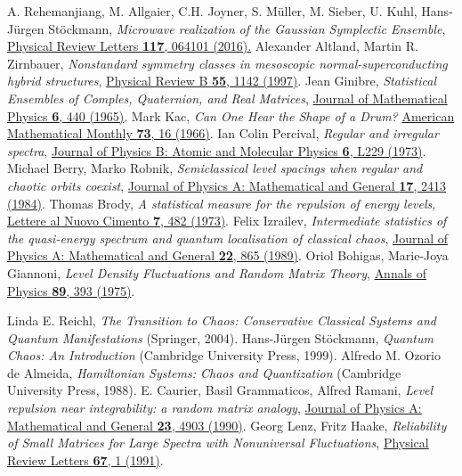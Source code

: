 \documentclass[a4paper,11pt,twoside]{article}
\begin{document}
\begin{thebibliography}{99}
     A. Rehemanjiang, M. Allgaier, C.H. Joyner, S. Müller, M. Sieber, U. Kuhl, Hans-Jürgen Stöckmann, {\it Microwave realization of the Gaussian Symplectic Ensemble}, \href{https://link.aps.org/doi/10.1103/PhysRevLett.117.064101}{Physical Review Letters {\bf 117}, 064101 (2016).}
     Alexander Altland, Martin R. Zirnbauer, {\it Nonstandard symmetry classes in mesoscopic normal-superconducting hybrid structures}, \href{https://journals.aps.org/prb/abstract/10.1103/PhysRevB.55.1142}{Physical Review B {\bf 55}, 1142 (1997)}.
     Jean Ginibre, {\it Statistical Ensembles of Comples, Quaternion, and Real Matrices}, \href{https://aip.scitation.org/doi/10.1063/1.1704292}{Journal of Mathematical Physics {\bf 6}, 440 (1965)}.
     Mark Kac, {\it Can One Hear the Shape of a Drum?} \href{https://www.maa.org/sites/default/files/pdf/upload_library/22/Ford/MarkKac.pdf}{American Mathematical Monthly {\bf 73}, 16 (1966)}.
     Ian Colin Percival, {\it Regular and irregular spectra}, \href{https://iopscience.iop.org/article/10.1088/0022-3700/6/9/002/pdf}{Journal of Physics B: Atomic and Molecular Physics {\bf 6}, L229 (1973)}.
     Michael Berry, Marko Robnik, {\it Semiclassical level spacings when regular and chaotic orbits coexist}, \href{https://iopscience.iop.org/article/10.1088/0305-4470/17/12/013}{Journal of Physics A: Mathematical and General {\bf 17}, 2413 (1984)}.
     Thomas Brody, {\it A statistical measure for the repulsion of energy levels}, \href{https://link.springer.com/article/10.1007/BF02727859}{Lettere al Nuovo Cimento {\bf 7}, 482 (1973)}.
     Felix Izrailev, {\it Intermediate statistics of the quasi-energy spectrum and quantum localisation of classical chaos}, \href{https://iopscience.iop.org/article/10.1088/0305-4470/22/7/017/meta}{Journal of Physics A: Mathematical and General {\bf 22}, 865 (1989)}.
     Oriol Bohigas, Marie-Joya Giannoni, {\it Level Density Fluctuations and Random Matrix Theory}, \href{https://www.sciencedirect.com/science/article/abs/pii/0003491675901876}{Annals of Physics {\bf 89}, 393 (1975)}.

     Linda E. Reichl, {\it The Transition to Chaos: Conservative Classical Systems and Quantum Manifestations} (Springer, 2004).
     Hans-Jürgen Stöckmann, {\it Quantum Chaos: An Introduction} (Cambridge University Press, 1999).
     Alfredo M. Ozorio de Almeida, {\it Hamiltonian Systems: Chaos and Quantization} (Cambridge University Press, 1988).
     E. Caurier, Basil Grammaticos, Alfred Ramani, {\it Level repulsion near integrability: a random matrix analogy}, \href{https://iopscience.iop.org/article/10.1088/0305-4470/23/21/029}{Journal of Physics A: Mathematical and General {\bf 23}, 4903 (1990)}.
     Georg Lenz, Fritz Haake, {\it Reliability of Small Matrices for Large Spectra with Nonuniversal Fluctuations}, \href{https://journals.aps.org/prl/abstract/10.1103/PhysRevLett.67.1}{Physical Review Letters {\bf 67}, 1 (1991)}.
\end{thebibliography}
\end{document}
